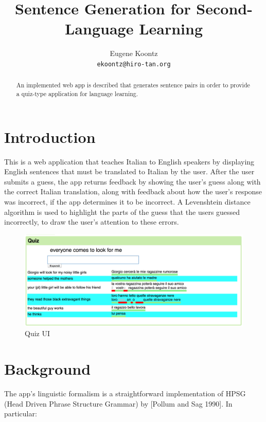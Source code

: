 \documentclass[11pt]{article}
\title{Sentence Generation for Second-Language Learning}
\author{Eugene Koontz\\
  {\tt ekoontz@hiro-tan.org} }
\date{}
\begin{document}
\maketitle
\begin{abstract}
  An implemented web app is described that generates sentence pairs in
  order to provide a quiz-type application for language learning.
\end{abstract}

\section{Introduction}

This is a web application that teaches Italian to English speakers by
displaying English sentences that must be translated to Italian by the
user. After the user submits a guess, the app returns feedback by
showing the user's guess along with the correct Italian translation,
along with feedback about how the user's response was incorrect, if
the app determines it to be incorrect. A Levenshtein distance
algorithm is used to highlight the parts of the guess that the users
guessed incorrectly, to draw the user's attention to these errors.

\begin{figure}[H]
  \includegraphics[scale=0.20]{quiz}
  \caption{Quiz UI}
\end{figure}

\section{Background}

The app's linguistic formalism is a straightforward implementation of
HPSG (Head Driven Phrase Structure Grammar) by [Pollum and Sag 1990]. In
particular:
\end{document}

